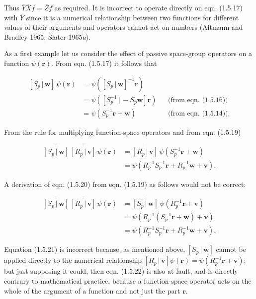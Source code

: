 \documentclass[11pt,a4paper,twoside,openright]{book}
\begin{document}
Thus $\bar{Y}\bar{X}f = \bar{Z}f$ as required. It is incorrect to operate directly on eqn. (1.5.17) with $\bar{Y}$ since it is a numerical relationship between two functions for different values of their arguments and operators cannot act on numbers (Altmann and Bradley 1965, Slater 1965\textit{a}).

As a first example let us consider the effect of passive space-group operators on a function $\psi(\mathbf{r})$. From eqn. (1.5.17) it follows that

\begin{align*}
\overline{[S_{p} \,|\, \mathbf{w}]}\,\psi(\mathbf{r}) &= \psi([S_{p} \,|\, \mathbf{w}]^{-1}\mathbf{r}) \\
&= \psi([S_{p}^{-1} \,|\, -S_{p}\mathbf{w}]\mathbf{r}) &&\text{(from eqn. (1.5.16))} \tag{1.5.18}\\
&= \psi(S_{p}^{-1}\mathbf{r} + \mathbf{w}) &&\text{(from eqn. (1.5.14))}. \tag{1.5.19}
\end{align*}

From the rule for multiplying function-space operators and from eqn. (1.5.19)

\begin{align*}
\overline{[S_{p} \,|\, \mathbf{w}]}\,\overline{[R_{p} \,|\, \mathbf{v}]}\,\psi(\mathbf{r}) &= \overline{[R_{p} \,|\, \mathbf{v}]}\,\psi(S_{p}^{-1}\mathbf{r} + \mathbf{w}) \\
&= \psi(R_{p}^{-1}S_{p}^{-1}\mathbf{r} + R_{p}^{-1}\mathbf{w} + \mathbf{v}). \tag{1.5.20}
\end{align*}

A derivation of eqn. (1.5.20) from eqn. (1.5.19) as follows would not be correct:

\begin{align*}
\overline{[S_{p} \,|\, \mathbf{w}]}\,\overline{[R_{p} \,|\, \mathbf{v}]}\,\psi(\mathbf{r}) &= \overline{[S_{p} \,|\, \mathbf{w}]}\,\psi(R_{p}^{-1}\mathbf{r} + \mathbf{v}) \tag{1.5.21}\\
&= \psi(R_{p}^{-1}(S_{p}^{-1}\mathbf{r} + \mathbf{w}) + \mathbf{v}) \tag{1.5.22}\\
&= \psi(R_{p}^{-1}S_{p}^{-1}\mathbf{r} + R_{p}^{-1}\mathbf{w} + \mathbf{v}). \tag{1.5.20}
\end{align*}

Equation (1.5.21) is incorrect because, as mentioned above, $[S_{p} \,|\, \mathbf{w}]$ cannot be applied directly to the numerical relationship $[R_{p} \,|\, \mathbf{v}]\psi(\mathbf{r}) = \psi(R_{p}^{-1}\mathbf{r} + \mathbf{v})$; but just supposing it could, then eqn. (1.5.22) is also at fault, and is directly contrary to mathematical practice, because a function-space operator acts on the whole of the argument of a function and not just the part $\mathbf{r}$.
\end{document}
